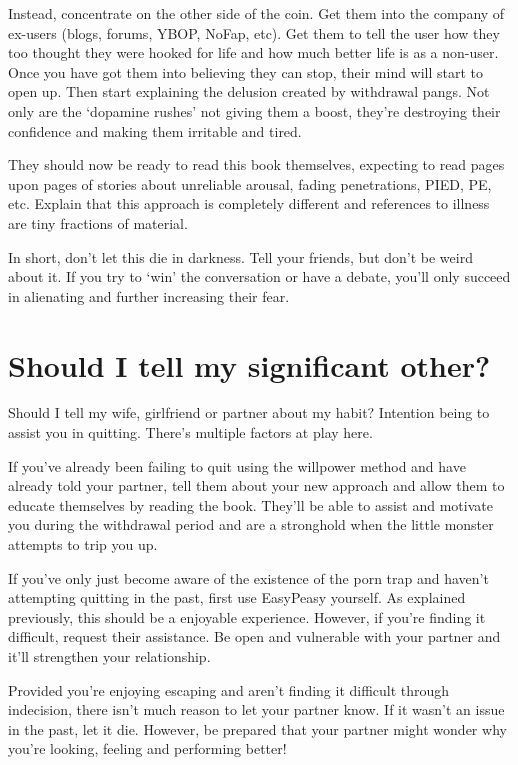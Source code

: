 \documentclass[
]{book}
\begin{document}
Instead, concentrate on the other side of the coin. Get them into the company of ex-users (blogs, forums, YBOP, NoFap, etc). Get them to tell the user how they too thought they were hooked for life and how much better life is as a non-user. Once you have got them into believing they can stop, their mind will start to open up. Then start explaining the delusion created by withdrawal pangs. Not only are the `dopamine rushes' not giving them a boost, they're destroying their confidence and making them irritable and tired.

They should now be ready to read this book themselves, expecting to read pages upon pages of stories about unreliable arousal, fading penetrations, PIED, PE, etc. Explain that this approach is completely different and references to illness are tiny fractions of material.

In short, don't let this die in darkness. Tell your friends, but don't be weird about it. If you try to `win' the conversation or have a debate, you'll only succeed in alienating and further increasing their fear.

\hypertarget{should-i-tell-my-significant-other}{%
\section{Should I tell my significant other?}\label{should-i-tell-my-significant-other}}

Should I tell my wife, girlfriend or partner about my habit? Intention being to assist you in quitting. There's multiple factors at play here.

If you've already been failing to quit using the willpower method and have already told your partner, tell them about your new approach and allow them to educate themselves by reading the book. They'll be able to assist and motivate you during the withdrawal period and are a stronghold when the little monster attempts to trip you up.

If you've only just become aware of the existence of the porn trap and haven't attempting quitting in the past, first use EasyPeasy yourself. As explained previously, this should be a enjoyable experience. However, if you're finding it difficult, request their assistance. Be open and vulnerable with your partner and it'll strengthen your relationship.

Provided you're enjoying escaping and aren't finding it difficult through indecision, there isn't much reason to let your partner know. If it wasn't an issue in the past, let it die. However, be prepared that your partner might wonder why you're looking, feeling and performing better!
\end{document}

